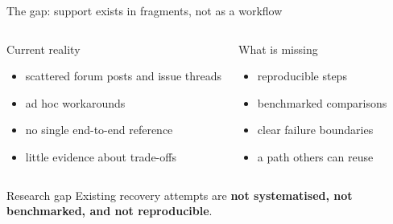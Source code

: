 \documentclass[aspectratio=169,11pt]{beamer}
\newcommand{\kw}[1]{\textbf{#1}}
\begin{document}
\begin{frame}{The gap: support exists in fragments, not as a workflow}
    \begin{columns}[T,onlytextwidth]
        \begin{block}{Current reality}
            \begin{itemize}
                \item scattered forum posts and issue threads
                \item ad hoc workarounds
                \item no single end-to-end reference
                \item little evidence about trade-offs
            \end{itemize}
        \end{block}

        \begin{block}{What is missing}
            \begin{itemize}
                \item reproducible steps
                \item benchmarked comparisons
                \item clear failure boundaries
                \item a path others can reuse
            \end{itemize}
        \end{block}
    \end{columns}

    \vspace{0.2cm}
    \begin{alertblock}{Research gap}
        Existing recovery attempts are \kw{not systematised, not benchmarked, and not reproducible}.
    \end{alertblock}
\end{frame}
\end{document}
